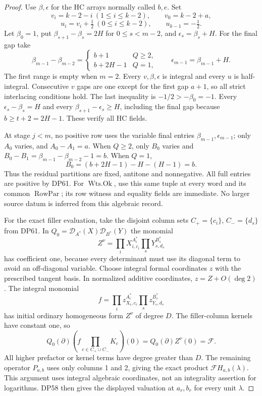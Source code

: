 \begin{proof}
Use $\beta,\epsilon$ for the HC arrays normally called $b,e$.
Set
\[
 v_i=k-2-i\ (1\le i\le k-2),\qquad v_0=k-2+a,
\]
\[
 u_i=v_i+\tfrac12\ (0\le i\le k-2),\qquad u_{k-1}=-\tfrac12.
\]
Let $\beta_0=1$, put $\beta_{s+1}-\beta_s=2H$ for $0\le s<m-2$,
and $\epsilon_s=\beta_s+H$. For the final gap take
\[
 \beta_{m-1}-\beta_{m-2}=
 \begin{cases}b+1&Q\ge2,\\b+2H-1&Q=1,\end{cases}
 \qquad\epsilon_{m-1}=\beta_{m-1}+H.
\]
The first range is empty when $m=2$. Every $v,\beta,\epsilon$ is
integral and every $u$ is half-integral. Consecutive $v$ gaps are one
except for the first gap $a+1$, so all strict interlacing conditions
hold. The last inequality is $-1/2>-\beta_0=-1$.
Every $\epsilon_s-\beta_s=H$ and every
$\beta_{s+1}-\epsilon_s\ge H$, including the final gap because
$b\ge t+2=2H-1$. These verify all HC fields.

At stage $j<m$, no positive row uses the variable final entries
$\beta_{m-1},\epsilon_{m-1}$; only $A_0$ varies, and
$A_0-A_1=a$. When $Q\ge2$, only $B_0$ varies and
$B_0-B_1=\beta_{m-1}-\beta_{m-2}-1=b$.
When $Q=1$,
\[
 B_0=(b+2H-1)-H-(H-1)=b.
\]
Thus the residual partitions are fixed, antitone and nonnegative.
All full entries are positive by DP61. For $\operatorname{Wts.Ok}$,
use this same tuple at every word and its common $\operatorname{RowPar}$;
its row witness and equality fields are immediate. No larger source
datum is inferred from this algebraic record.

For the exact filler evaluation, take the disjoint column sets
$C_+=\{c_i\}$, $C_-=\{d_s\}$ from DP61. In
$Q_0=\mathcal D_{A^*}(X)\mathcal D_{B^*}(Y)$ the monomial
\[
 Z^\nu=\prod_iX_{i,c_i}^{A_i^*}\prod_sY_{s,d_s}^{B_s^*}
\]
has coefficient one, because every determinant must use its diagonal
term to avoid an off-diagonal variable. Choose integral formal
coordinates $z$ with the prescribed tangent basis. In normalized
additive coordinates, $z=Z+O(\deg2)$. The integral monomial
\[
 f=\prod_i z_{X_i,c_i}^{A_i^*}\prod_s z_{Y_s,d_s}^{B_s^*}
\]
has initial ordinary homogeneous form $Z^\nu$ of degree $D$.
The filler-column kernels have constant one, so
\[
 Q_0(\partial)\left(f\prod_{c\in C_+\cup C_-}K_c\right)(0)
 =Q_0(\partial)Z^\nu(0)=\mathcal F.
\]
All higher prefactor or kernel terms have degree greater than $D$.
The remaining operator $P_{a,b}$ uses only columns 1 and 2, giving the
exact product $\mathcal F H_{a,b}(\lambda)$. This argument uses integral
algebraic coordinates, not an integrality assertion for logarithms.
DP58 then gives the displayed valuation at $a_r,b_r$ for every unit
$\lambda$.


\end{proof}
